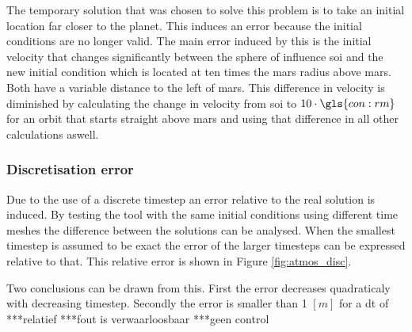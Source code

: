 The temporary solution that was chosen to solve this problem is to take an initial location far closer to the planet. This induces an error because the initial conditions are no longer valid. The main error induced by this is the initial velocity that changes significantly between the sphere of influence \gls{soi} and the new initial condition which is located at ten times the mars radius above mars. Both have a variable distance to the left of mars. This difference in velocity is diminished by calculating the change in velocity from \gls{soi} to $10\cdot\gls{con:rm}$ for an orbit that starts straight above mars and using that difference in all other calculations aswell.

\subsubsection{Discretisation error}
\label{sec:astrodisc}

Due to the use of a discrete timestep an error relative to the real solution is induced. By testing the tool with the same initial conditions using different time meshes the difference between the solutions can be analysed. When the smallest timestep is assumed to be exact the error of the larger timesteps can be expressed relative to that. This relative error is shown in Figure \ref{fig:atmos_disc}. 

Two conclusions can be drawn from this. First the error decreases quadraticaly with decreasing timestep. Secondly the error is smaller than 1 $\left[m\right]$ for a dt of
***relatief
***fout is verwaarloosbaar
***geen control



